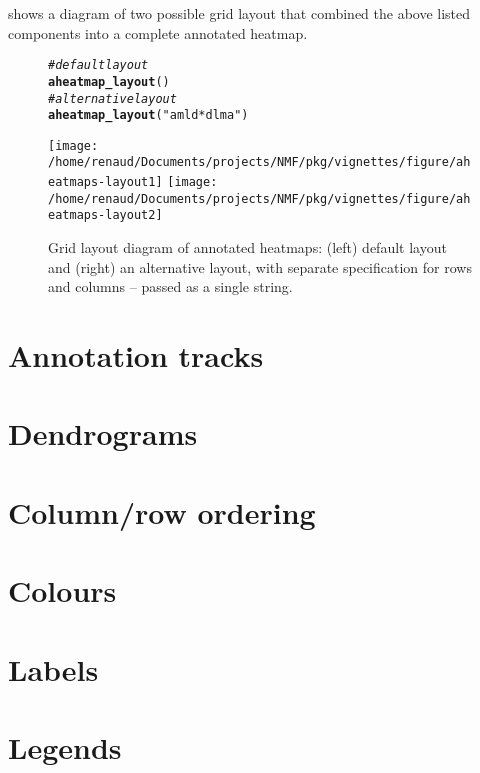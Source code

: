 \documentclass[a4paper]{article}\usepackage[]{graphicx}\usepackage[]{color}
\makeatletter
\newcommand{\hlstr}[1]{\textcolor[rgb]{0.192,0.494,0.8}{#1}}%
\newcommand{\hlcom}[1]{\textcolor[rgb]{0.678,0.584,0.686}{\textit{#1}}}%
\newcommand{\hlstd}[1]{\textcolor[rgb]{0.345,0.345,0.345}{#1}}%
\newcommand{\hlkwd}[1]{\textcolor[rgb]{0.737,0.353,0.396}{\textbf{#1}}}%
\newenvironment{kframe}{%
 \def\at@end@of@kframe{}%
 \ifinner\ifhmode%
  \def\at@end@of@kframe{\end{minipage}}%
  \begin{minipage}{\columnwidth}%
 \fi\fi%
 \def\FrameCommand##1{\hskip\@totalleftmargin \hskip-\fboxsep
 \colorbox{shadecolor}{##1}\hskip-\fboxsep
     \hskip-\linewidth \hskip-\@totalleftmargin \hskip\columnwidth}%
 \MakeFramed {\advance\hsize-\width
   \@totalleftmargin\z@ \linewidth\hsize
   \@setminipage}}%
 {\par\unskip\endMakeFramed%
 \at@end@of@kframe}
\newenvironment{knitrout}{}{} %
\makeatother
\begin{document}
 shows a diagram of two possible grid layout that combined
the above listed components into a complete annotated heatmap.

\begin{figure}[!htpb]
\label{fig:layout}
\begin{knitrout}
\color{fgcolor}\begin{kframe}
\begin{alltt}
\hlcom{# default layout}
\hlkwd{aheatmap_layout}\hlstd{()}
\hlcom{# alternative layout}
\hlkwd{aheatmap_layout}\hlstd{(}\hlstr{"amld * dlma"}\hlstd{)}
\end{alltt}
\end{kframe}
\texttt{[image: /home/renaud/Documents/projects/NMF/pkg/vignettes/figure/aheatmaps-layout1]} 
\texttt{[image: /home/renaud/Documents/projects/NMF/pkg/vignettes/figure/aheatmaps-layout2]} 

\end{knitrout}

\caption{Grid layout diagram of annotated heatmaps: (left) default layout and
(right) an alternative layout, with separate specification for rows
and columns -- passed as a single string.}
\end{figure}

\section{Annotation tracks}
\section{Dendrograms}
\section{Column/row ordering}
\section{Colours}
\section{Labels}
\section{Legends}
\end{document}
